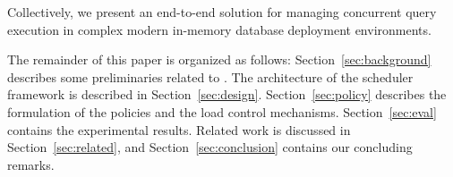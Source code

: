 Collectively, we present an end-to-end solution for managing concurrent query execution in complex modern in-memory database deployment environments.

The remainder of this paper is organized as follows: Section~\ref{sec:background} describes some preliminaries related to \sys{}. 
The architecture of the scheduler framework is described in Section~\ref{sec:design}. 
Section~\ref{sec:policy} describes the  formulation of the policies and the load control mechanisms.
Section~\ref{sec:eval} contains the experimental results. Related work is discussed in Section~\ref{sec:related}, and Section~\ref{sec:conclusion} contains our concluding remarks.

